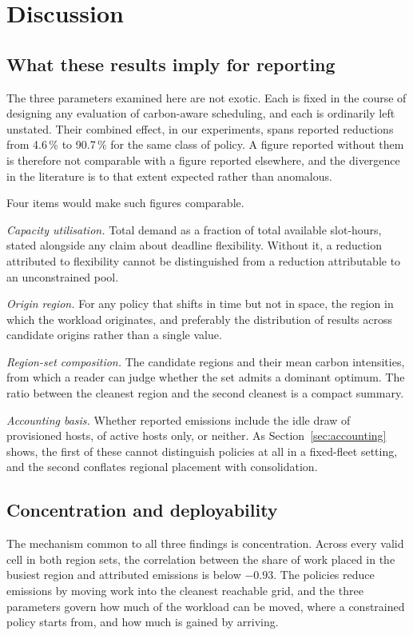 \section{Discussion}
\label{sec:discussion}

\subsection{What these results imply for reporting}

The three parameters examined here are not exotic. Each is fixed in the course
of designing any evaluation of carbon-aware scheduling, and each is ordinarily
left unstated. Their combined effect, in our experiments, spans reported
reductions from 4.6\,\% to 90.7\,\% for the same class of policy. A figure
reported without them is therefore not comparable with a figure reported
elsewhere, and the divergence in the literature is to that extent expected
rather than anomalous.

Four items would make such figures comparable.

\emph{Capacity utilisation.} Total demand as a fraction of total available
slot-hours, stated alongside any claim about deadline flexibility. Without it, a
reduction attributed to flexibility cannot be distinguished from a reduction
attributable to an unconstrained pool.

\emph{Origin region.} For any policy that shifts in time but not in space, the
region in which the workload originates, and preferably the distribution of
results across candidate origins rather than a single value.

\emph{Region-set composition.} The candidate regions and their mean carbon
intensities, from which a reader can judge whether the set admits a dominant
optimum. The ratio between the cleanest region and the second cleanest is a
compact summary.

\emph{Accounting basis.} Whether reported emissions include the idle draw of
provisioned hosts, of active hosts only, or neither. As
Section~\ref{sec:accounting} shows, the first of these cannot distinguish
policies at all in a fixed-fleet setting, and the second conflates regional
placement with consolidation.

\subsection{Concentration and deployability}

The mechanism common to all three findings is concentration. Across every valid
cell in both region sets, the correlation between the share of work placed in
the busiest region and attributed emissions is below $-0.93$. The policies
reduce emissions by moving work into the cleanest reachable grid, and the three
parameters govern how much of the workload can be moved, where a constrained
policy starts from, and how much is gained by arriving.

